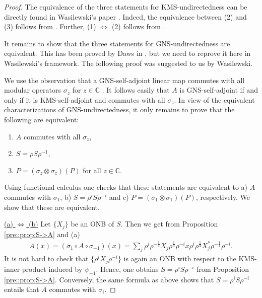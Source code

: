 \documentclass{amsart}
\newcommand{\C}{\mathbb{C}}
\begin{document}
\begin{proof}
    The equivalence of the three statements for KMS-undirectedness can be directly found in Wasilewski's paper \cite{wasilewski_quantum_2024}. Indeed, the equivalence between (2) and (3) follows from \cite[Proposition 3.7 (iv)]{wasilewski_quantum_2024}. Further, (1) $\Leftrightarrow$ (2) follows from \cite[Proposition 3.29]{wasilewski_quantum_2024}.
    

    It remains to show that the three statements for GNS-undirectedness are equivalent. This has been proved by Daws in \cite{daws_quantum_2024}, but we need to reprove it here in Wasilewski's framework. The following proof was suggested to us by Wasilewski.
    
    We use the observation that a GNS-self-adjoint linear map commutes with all modular operators $\sigma_z$ for $z \in \C$ \cite[Lemma 2.1]{wasilewski_quantum_2024}. It follows easily that $A$ is GNS-self-adjoint if and only if it is KMS-self-adjoint and commutes with all $\sigma_z$. In view of the equivalent characterizations of GNS-undirectedness, it only remains to prove that the following are equivalent:
    \begin{enumerate}
        \item[(a)] $A$ commutes with all $\sigma_z$,
        \item[(b)] $S = \rho S \rho^{-1}$,
        \item[(c)] $P = (\sigma_z \otimes \sigma_z)(P)$ for all $z \in \C$.
    \end{enumerate}

    Using functional calculus one checks that these statements are equivalent to a) $A$ commutes with $\sigma_1$, b) $S = \rho^i S \rho^{-i}$ and c) $P = (\sigma_1 \otimes \sigma_1)(P)$, respectively. We show that these are equivalent.

    \underline{(a) $\Leftrightarrow$ (b)} Let $\{X_j\}$ be an ONB of $S$. Then we get from Proposition \ref{pre::prop:S->A} and (a)
    \begin{align*}
        A(x) = (\sigma_{1} \circ A \circ \sigma_{-1})(x)
            = \sum_j\rho^i \rho^{-\frac{1}{4}} X_j \rho^{\frac{1}{4}}\rho^{-i} x \rho^i \rho^{\frac{1}{4}}X_j^*\rho^{-\frac{1}{4}} \rho^{-i}.
    \end{align*}
    It is not hard to check that $\{\rho^i X_j \rho^{-i}\}$ is again an ONB with respect to the KMS-inner product induced by $\psi_{-1}$. Hence, one obtains $S = \rho^i S \rho^{-i}$ from Proposition \ref{pre::prop:S->A}. 
    Conversely, the same formula as above shows that $S = \rho^i S \rho^{-i}$ entails that $A$ commutes with $\sigma_{i}$. 


\end{proof}
\end{document}
